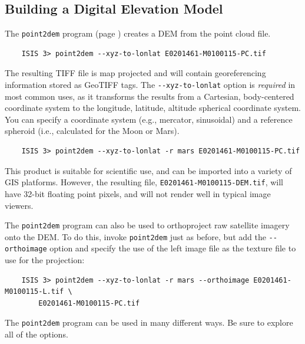 \subsection{Building a Digital Elevation Model}

The \texttt{point2dem} program (page \pageref{point2dem}) creates a
\ac{DEM} from the point cloud file.

\begin{verbatim}
    ISIS 3> point2dem --xyz-to-lonlat E0201461-M0100115-PC.tif
\end{verbatim}

\noindent
The resulting TIFF file is map projected and will contain
georeferencing information stored as GeoTIFF tags.  The
\texttt{-\/-xyz-to-lonlat} option is {\em required} in most common uses, as
it transforms the results from a Cartesian, body-centered coordinate
system to the longitude, latitude, altitude spherical coordinate
system.  You can specify a coordinate system (e.g., mercator,
sinusoidal) and a reference spheroid (i.e., calculated for the Moon or
Mars).

\begin{verbatim}
    ISIS 3> point2dem --xyz-to-lonlat -r mars E0201461-M0100115-PC.tif
\end{verbatim}

\noindent
This product is suitable for scientific use, and can be imported into
a variety of GIS platforms.  However, the resulting file,
\texttt{E0201461-M0100115-DEM.tif}, will have 32-bit floating point
pixels, and will not render well in typical image viewers.

The \texttt{point2dem} program can also be used to orthoproject raw
satellite imagery onto the \ac{DEM}. To do this, invoke
\texttt{point2dem} just as before, but add the \texttt{-\/-orthoimage}
option and specify the use of the left image file as the texture file
to use for the projection:

\begin{verbatim}
    ISIS 3> point2dem --xyz-to-lonlat -r mars --orthoimage E0201461-M0100115-L.tif \
        E0201461-M0100115-PC.tif
\end{verbatim}

\noindent
The \texttt{point2dem} program can be used in many different ways.  Be
sure to explore all of the options.

